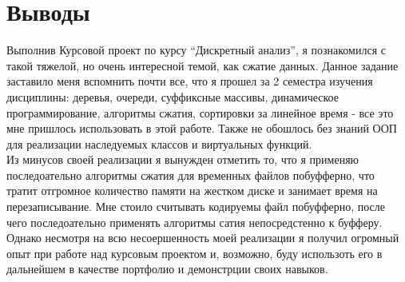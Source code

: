 \section{Выводы}
Выполнив Курсовой проект по курсу \enquote{Дискретный анализ}, я познакомился с такой тяжелой, но очень интересной темой, как сжатие данных. Данное задание заставило меня вспомнить почти все, что я прошел за 2 семестра изучения дисциплины: деревья, очереди, суффиксные массивы, динамическое программирование, алгоритмы сжатия, сортировки за линейное время - все это мне пришлось использовать в этой работе. Также не обошлось без знаний ООП для реализации наследуемых классов и виртуальных функций.\\

Из минусов своей реализации я вынужден отметить то, что я применяю последоательно алгоритмы сжатия для временных файлов побуфферно, что тратит отгромное количество памяти на жестком диске и занимает время на перезаписывание. Мне стоило считывать кодируемы файл побуфферно, после чего последоательно применять алгоритмы сатия непосредстенно к буфферу.\\

Однако несмотря на всю несоершенность моей реализации я получил огромный опыт при работе над курсовым проектом и, возможно, буду использоть его в дальнейшем в качестве портфолио и демонстрции своих навыков.
\pagebreak